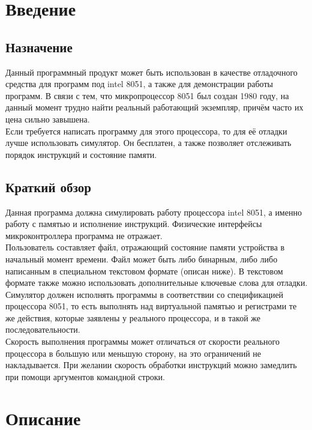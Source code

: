 





\large



\tableofcontents
\newpage


\section{Введение}
\subsection{Назначение}
Данный программный продукт может быть использован в качестве отладочного средства для программ под intel 8051, а также для демонстрации работы программ. В связи с тем, что микропроцессор 8051 был создан 1980 году, на данный момент трудно найти реальный работающий экземпляр, причём часто их цена сильно завышена.\\
Если требуется написать программу для этого процессора, то для её отладки лучше использовать симулятор. Он бесплатен, а также позволяет отслеживать порядок инструкций и состояние памяти.\\
\subsection{Краткий обзор}
Данная программа должна симулировать работу процессора intel 8051, а именно работу с памятью и исполнение инструкций. Физические интерфейсы микроконтроллера программа не отражает.\\
Пользователь составляет файл, отражающий состояние памяти устройства в начальный момент времени. Файл может быть либо бинарным, либо либо написанным в специальном текстовом формате (описан ниже). В текстовом формате также можно использовать дополнительные ключевые слова для отладки.\\
Симулятор должен исполнять программы в соответствии со спецификацией процессора 8051, то есть выполнять над виртуальной памятью и регистрами те же действия, которые заявлены у реального процессора, и в такой же последовательности. \\
Скорость выполнения программы может отличаться от скорости реального процессора в большую или меньшую сторону, на это ограничений не накладывается.
При желании скорость обработки инструкций можно замедлить при помощи аргументов командной строки. \\

\section{Описание}

